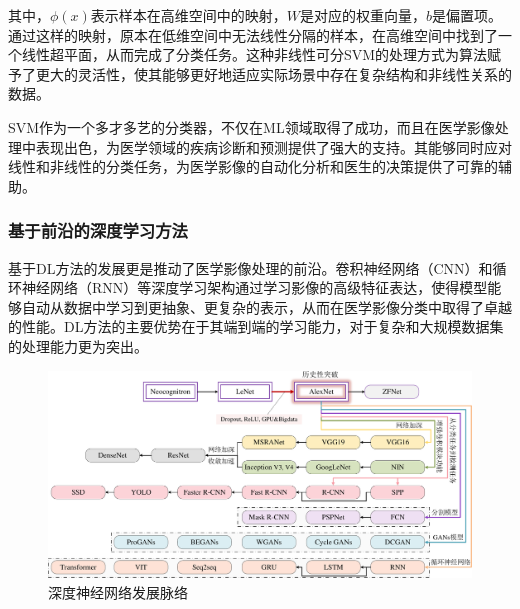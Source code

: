 其中，$\phi(x)$表示样本在高维空间中的映射，$W$是对应的权重向量，$b$是偏置项。通过这样的映射，原本在低维空间中无法线性分隔的样本，在高维空间中找到了一个线性超平面，从而完成了分类任务。这种非线性可分SVM的处理方式为算法赋予了更大的灵活性，使其能够更好地适应实际场景中存在复杂结构和非线性关系的数据。

SVM作为一个多才多艺的分类器，不仅在ML领域取得了成功，而且在医学影像处理中表现出色，为医学领域的疾病诊断和预测提供了强大的支持。其能够同时应对线性和非线性的分类任务，为医学影像的自动化分析和医生的决策提供了可靠的辅助。

\subsubsection{基于前沿的深度学习方法}
基于DL方法的发展更是推动了医学影像处理的前沿。卷积神经网络（CNN）和循环神经网络（RNN）等深度学习架构通过学习影像的高级特征表达，使得模型能够自动从数据中学习到更抽象、更复杂的表示，从而在医学影像分类中取得了卓越的性能。DL方法的主要优势在于其端到端的学习能力，对于复杂和大规模数据集的处理能力更为突出。

   \begin{figure}[htbp]
      \centering  
      \includegraphics[width=0.9\linewidth]{figs/CNNdevelopment.pdf}
      \caption{深度神经网络发展脉络}\label{CNNdevelopment}
    \end{figure}
    
